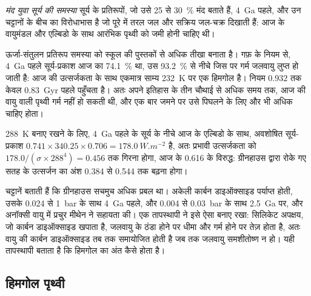 \begin{definition}[मंद युवा सूर्य की समस्या]\label{def:b2:precambrian-earth:faint-sun}
\emph{मंद युवा सूर्य की समस्या} सूर्य के प्रतिरूपों, जो उसे
25 से \qty{30}{\percent} मंद बताते हैं, \qty{4}{Ga} पहले, और उन
चट्टानों के बीच का विरोधाभास है जो पूरे  में तरल जल और सक्रिय जल-चक्र दिखाती हैं: आज के
वायुमंडल और एल्बिडो के साथ आरंभिक पृथ्वी को जमी होनी चाहिए थी।
\end{definition}

ऊर्जा-संतुलन प्रतिरूप समस्या को स्कूल की पुस्तकों से अधिक तीखा बनाता है। गफ़ के
नियम से, \qty{4}{Ga} पहले सूर्य-प्रकाश आज का \qty{74.1}{\percent} था, उस
\qty{93.2}{\percent} से नीचे जिस पर गर्म जलवायु लुप्त हो जाती है: आज की उत्सर्जकता के साथ एकमात्र
साम्य \qty{232}{K} पर एक हिमगोल है। नियम $0.932$ तक केवल
\qty{0.83}{Gyr} पहले पहुँचता है। अतः अपने इतिहास के तीन चौथाई से अधिक समय तक, आज की
वायु वाली पृथ्वी गर्म नहीं हो सकती थी, और एक बार जमने पर उसे पिघलने के लिए और भी अधिक चाहिए होता।

\begin{example}[युवा पृथ्वी का ग्रीनहाउस]\label{ex:b2:precambrian-earth:young-greenhouse}
\qty{288}{K} बनाए रखने के लिए, \qty{4}{Ga} पहले के सूर्य के नीचे आज के एल्बिडो के साथ, अवशोषित
सूर्य-प्रकाश $0.741\times340.25\times0.706 = \qty{178.0}{W.m^{-2}}$ है, अतः प्रभावी उत्सर्जकता
को $178.0/(\sigma\times288^4) = 0.456$ तक गिरना होगा, आज के 0.616 के विरुद्ध: ग्रीनहाउस द्वारा रोके गए
सतह के उत्सर्जन का अंश 0.384 से 0.544 तक बढ़ना होगा।
\end{example}

चट्टानें बताती हैं कि ग्रीनहाउस सचमुच अधिक प्रबल था। अकेली कार्बन डाइऑक्साइड पर्याप्त होती,
उसके 0.024 से \qty{1}{bar} के साथ \qty{4}{Ga} पहले, और 0.004 से \qty{0.03}{bar} के साथ \qty{2.5}{Ga} पर, और
अनॉक्सी वायु में प्रचुर मीथेन ने सहायता की। एक तापस्थापी ने इसे ऐसा बनाए रखा: सिलिकेट अपक्षय,
जो कार्बन डाइऑक्साइड खपाता है, जलवायु के ठंडा होने पर धीमा और गर्म होने पर तेज़ होता है, अतः
वायु की कार्बन डाइऑक्साइड तब तक समायोजित होती है जब तक जलवायु समशीतोष्ण न हो। यही तापस्थापी बताता है
कि हिमगोल का अंत कैसे होता है।

\subsection*{हिमगोल पृथ्वी}

